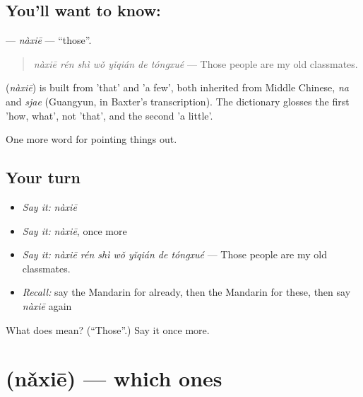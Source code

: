 \subsection*{You'll want to know: }
\textbf{} — \emph{nàxiē} — \textquotedblleft{}those\textquotedblright{}.

\begin{quote}
\textbf{} \emph{nàxiē rén shì wǒ yǐqián de tóngxué} — Those people are my old classmates.
\end{quote}

\begin{cousinweb}
\textbf{} (\emph{nàxiē}) is built from  'that' and  'a few', both inherited from Middle Chinese, \emph{na} and \emph{sjae} (Guangyun, in Baxter's transcription). The dictionary glosses the first 'how, what', not 'that', and the second 'a little'.
\end{cousinweb}

\begin{grammarlens}[title={What you've built}]
One more word for pointing things out.
\end{grammarlens}

\subsection*{Your turn}
\begin{itemize}
\raggedright
  \item \emph{Say it:} \emph{nàxiē}
  \item \emph{Say it:} \emph{nàxiē}, once more
  \item \emph{Say it:} \emph{nàxiē rén shì wǒ yǐqián de tóngxué} — Those people are my old classmates.
  \item \emph{Recall:} say the Mandarin for already, then the Mandarin for these, then say \emph{nàxiē} again
\end{itemize}

\begin{tcolorbox}[breakable,colback=teal!4,colframe=teal!35!black,title={Before you move on}]
What does  mean? (\textquotedblleft{}Those\textquotedblright{}.) Say it once more.
\end{tcolorbox}
\section[\texorpdfstring{\zh{哪些} (nǎxiē)}{哪些 (nǎxiē)}]{ (nǎxiē) — which ones}

